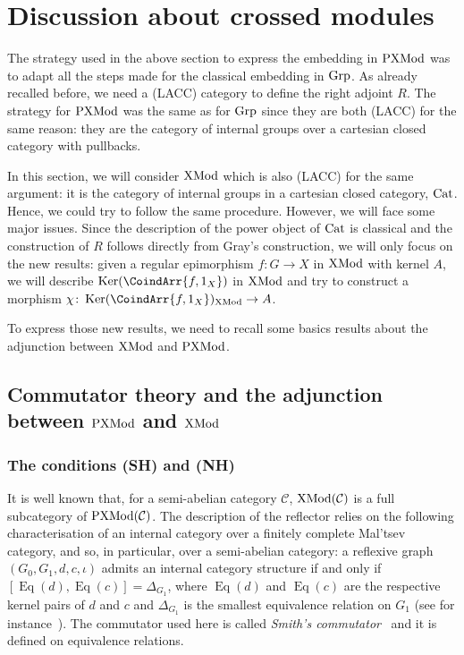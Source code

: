 \documentclass[a4paper, british, reqno]{amsart}
\DeclareMathOperator{\Eq}{Eq}
\DeclareMathOperator{\Ker}{Ker} %
\renewcommand*{\and}{,}
\renewcommand*{\and}{,}
\newcommand*{\CatSymb}[1]{\mathcal{#1}}
\newcommand*{\CatName}[1]{\textnormal{#1}}
\newcommand*{\CondName}[1]{\textnormal{(#1)}}
\newcommand*{\C}{\CatSymb{C}}
\newcommand*{\Grp}{\CatName{Grp}}
\newcommand*{\PXMod}{\CatName{PXMod}}
\newcommand*{\XMod}{\CatName{XMod}}
\newcommand*{\Cat}{\CatName{Cat}}
\newcommand*{\SH}{\CondName{SH}}
\newcommand*{\NH}{\CondName{NH}}
\newcommand*{\LACC}{\CondName{LACC}}
\theoremstyle{definition}
\theoremstyle{remark}
\begin{document}
\section{Discussion about crossed modules}
The strategy used in the above section to express the embedding in \(\PXMod\) was to adapt all the steps made for the classical embedding in \(\Grp\). As already recalled before, we need a \LACC{} category to define the right adjoint \(R\). The strategy for \(\PXMod\) was the same as for \(\Grp\) since they are both \LACC{} for the same reason: they are the category of internal groups over a cartesian closed category with pullbacks.

In this section, we will consider \(\XMod\) which is also \LACC{} for the same argument: it is the category of internal groups in a cartesian closed category, \(\Cat\). Hence, we could try to follow the same procedure. However, we will face some major issues. Since the description of the power object of \(\Cat\) is classical and the construction of \(R\) follows directly from Gray's construction, we will only focus on the new results: given a regular epimorphism \(f\colon G\to X\) in \(\XMod\) with kernel \(A\), we will describe \(\Ker(\CoindArr{f\and 1_X})\) in \(\XMod\) and try to construct a morphism \(\chi\colon \Ker(\CoindArr{f\and 1_X})_{\XMod}\to A\).

To express those new results, we need to recall some basics results about the adjunction between \(\XMod\) and \(\PXMod\).

\subsection{Commutator theory and the adjunction between \(\PXMod\) and \(\XMod\)}\label{subsection - general results about XMod}

\subsubsection{The conditions \SH{} and \NH{}}
It is well known that, for a semi-abelian category \(\C\), \(\XMod(\C)\) is a full subcategory of \(\PXMod(\C)\). The description of the reflector relies on the following characterisation of an internal category over a finitely complete Mal'tsev category, and so, in particular, over a semi-abelian category: a reflexive graph \((G_0,G_1, d,c,\iota)\) admits an internal category structure if and only if \([\Eq(d), \Eq(c)]=\Delta_{G_1}\), where \(\Eq(d)\) and \(\Eq(c)\) are the respective kernel pairs of \(d\) and \(c\) and \(\Delta_{G_1}\) is the smallest equivalence relation on \(G_1\) (see for instance~\cite{BB04}). The commutator used here is called \emph{Smith's commutator}~\cite{S76,P95} and it is defined on equivalence relations.
\end{document}
